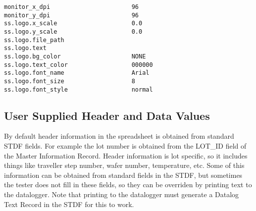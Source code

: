 \documentclass[letterpaper]{article}
\begin{document}
\begin{verbatim}
monitor_x_dpi                       96
monitor_y_dpi                       96
ss.logo.x_scale                     0.0
ss.logo.y_scale                     0.0
ss.logo.file_path           
ss.logo.text
ss.logo.bg_color                    NONE
ss.logo.text_color                  000000
ss.logo.font_name                   Arial
ss.logo.font_size                   8
ss.logo.font_style                  normal
\end{verbatim}
\clearpage

\subsection{\bf User Supplied Header and Data Values}

By default header information in the spreadsheet is obtained from
standard STDF fields.  For example the lot number is obtained
from the LOT\_ID field of the Master Information Record.  Header
information is lot specific, so it includes things like traveller
step number, wafer number, temperature, etc.  Some of this information
can be obtained from standard fields in the STDF, but sometimes
the tester does not fill in these fields, so they can be overriden 
by printing text to the datalogger.  Note that printing to the datalogger
must generate a Datalog Text Record in the STDF for this to work.
\end{document}
